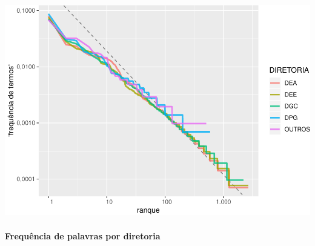 \documentclass[]{article}
\let\oldparagraph\paragraph
\renewcommand{\paragraph}[1]{\oldparagraph{#1}\mbox{}}
\begin{document}
\includegraphics{markdown_v30_files/figure-latex/unnamed-chunk-30-1.pdf}

\paragraph{Frequência de palavras por
diretoria}\label{frequencia-de-palavras-por-diretoria}
\end{document}
